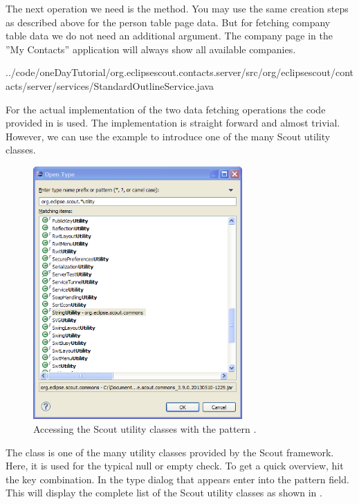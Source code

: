 \documentclass[a4paper,10pt,twoside]{book}
\begin{document}
The next operation we need is the  method. 
You may use the same creation steps as described above for the person table page data. 
But for fetching company table data we do not need an additional argument.
The company page in the ''My Contacts'' application will always show all available companies. 


{../code/oneDayTutorial/org.eclipsescout.contacts.server/src/org/eclipsescout/contacts/server/services/StandardOutlineService.java}

For the actual implementation of the two data fetching operations the code provided in  is used. 
The implementation is straight forward and almost trivial. 
However, we can use the  example to introduce one of the many Scout utility classes. 

\begin{figure}
\includegraphics[width=8cm]{scout_utility_classes.png}
\caption{Accessing the Scout utility classes with the pattern .}
\end{figure}

The class  is one of the many utility classes provided by the Scout framework. 
Here, it is used for the typical null or empty check. 
To get a quick overview, hit the  key combination. 
In the type dialog that appears enter  into the pattern field. 
This will display the complete list of the Scout utility classes as shown in .
\end{document}

